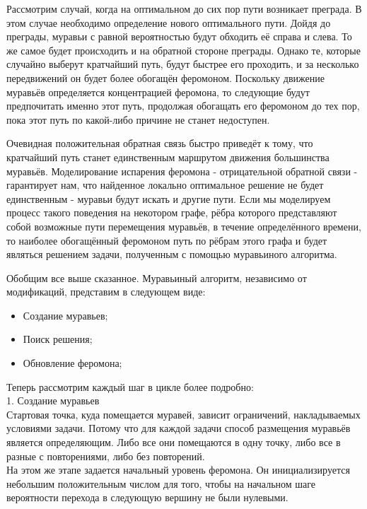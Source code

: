 \documentclass[a4paper, 12pt]{article}
\begin{document}
	 \hspace*{5mm} Рассмотрим случай, когда на оптимальном до сих пор пути возникает преграда. В этом случае необходимо определение нового оптимального пути. Дойдя до преграды, муравьи с равной вероятностью будут обходить её справа и слева. То же самое будет происходить и на обратной стороне преграды. Однако те, которые случайно выберут кратчайший путь, будут быстрее его проходить, и за несколько передвижений он будет более обогащён феромоном. Поскольку движение муравьёв определяется концентрацией феромона, то следующие будут предпочитать именно этот путь, продолжая обогащать его феромоном до тех пор, пока этот путь по какой-либо причине не станет недоступен.
	
	 \hspace*{5mm} Очевидная положительная обратная связь быстро приведёт к тому, что кратчайший путь станет единственным маршрутом движения большинства муравьёв. Моделирование испарения феромона - отрицательной обратной связи - гарантирует нам, что найденное локально оптимальное решение не будет единственным - муравьи будут искать и другие пути. Если мы моделируем процесс такого поведения на некотором графе, рёбра которого представляют собой возможные пути перемещения муравьёв, в течение определённого времени, то наиболее обогащённый феромоном путь по рёбрам этого графа и будет являться решением задачи, полученным с помощью муравьиного алгоритма.
	
	Обобщим все выше сказанное. Муравьиный алгоритм, независимо от модификаций, представим в следующем виде:
	\begin{itemize}
		\item Создание муравьев;
		\item Поиск решения;
		\item Обновление феромона;
	\end{itemize}
	
	\hspace*{-5mm}Теперь рассмотрим каждый шаг в цикле более подробно:\\
	
	\hspace*{-5mm}1. Создание муравьев\\
	\hspace*{5mm} Стартовая точка, куда помещается муравей, зависит ограничений,   накладываемых условиями задачи. Потому что для каждой задачи   способ размещения муравьёв является определяющим. Либо все они помещаются в одну точку, либо все в разные с повторениями, либо без повторений. \\
	На этом же этапе задается начальный уровень феромона. Он    инициализируется небольшим положительным числом для того, чтобы на начальном шаге вероятности перехода в следующую вершину не были нулевыми. \\
	
\end{document}
